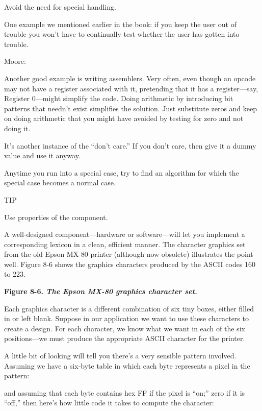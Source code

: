 Avoid the need for special handling.

One example we mentioned earlier in the book: if you keep the user out of
trouble you won't have to continually test whether the user has gotten
into trouble.

Moore:

Another good example is writing assemblers. Very often, even though an
opcode may not have a register associated with it, pretending that it has a
register---say, Register 0---might simplify the code. Doing arithmetic by
introducing bit patterns that needn't exist simplifies the solution. Just
substitute zeros and keep on doing arithmetic that you might have avoided
by testing for zero and not doing it.

It's another instance of the ``don't care.'' If you don't care, then give
it a dummy value and use it anyway.

Anytime you run into a special case, try to find an algorithm for which
the special case becomes a normal case.

TIP

Use properties of the component.

A well-designed component---hardware or software---will let you implement
a corresponding lexicon in a clean, efficient manner. The character
graphics set from the old Epson MX-80 printer (although now obsolete)
illustrates the point well. Figure 8-6 shows the graphics characters
produced by the ASCII codes 160 to 223.

\bf{Figure 8-6.} \emph{The Epson MX-80 graphics character set.}


Each graphics character is a different combination of six tiny boxes,
either filled in or left blank. Suppose in our application we want to use
these characters to create a design. For each character, we know what we
want in each of the six positions---we must produce the appropriate
ASCII character for the printer.

A little bit of looking will tell you there's a very sensible pattern
involved. Assuming we have a six-byte table in which each byte represents
a pixel in the pattern:


and assuming that each byte contains hex FF if the pixel is ``on;'' zero if
it is ``off,'' then here's how little code it takes to compute the character:

